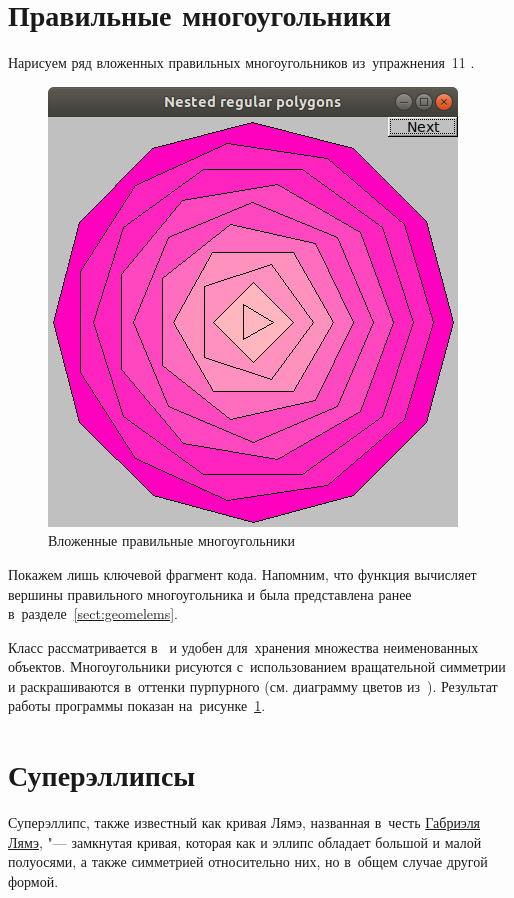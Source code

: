 
\section{Правильные многоугольники}
Нарисуем ряд вложенных правильных многоугольников из~упражнения~11 .

\begin{figure}[ht]
  {\centering
    \includegraphics[height=0.3\textwidth]{images/regular_polygons.png}

  }
  \caption{Вложенные правильные многоугольники}
  \label{fig:regpoly}
\end{figure}

Покажем лишь ключевой фрагмент кода. Напомним, что функция  вычисляет вершины правильного многоугольника и была представлена ранее в~разделе~\ref{sect:geomelems}.


Класс  рассматривается в~ и удобен для~хранения множества неименованных объектов. Многоугольники рисуются с~использованием вращательной симметрии и раскрашиваются в~оттенки пурпурного (см. диаграмму цветов из~). Результат работы программы показан на~рисунке~\ref{fig:regpoly}.



\section{Суперэллипсы}
Суперэллипс, также известный как кривая Лямэ, названная в~честь \href{https://en.wikipedia.org/wiki/Gabriel_Lam\%C3\%A9}{Габриэля Лямэ}, "--- замкнутая кривая, которая как и эллипс обладает большой и малой полуосями, а также симметрией относительно них, но в~общем случае другой формой.

